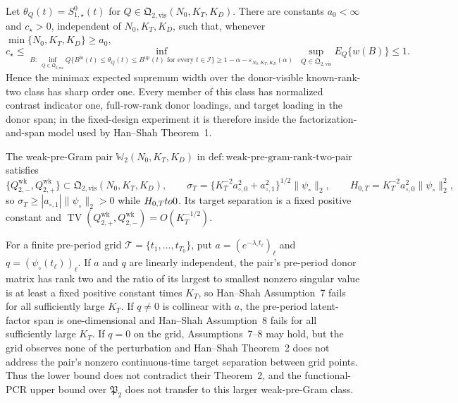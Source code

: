 Let \(\theta_Q(t)=S^0_{1,\star}(t)\) for \(Q\in\mathfrak Q_{2,\mathrm{vis}}(N_0,K_T,K_D)\).  There are constants \(a_0<\infty\) and \(c_\star>0\), independent of \(N_0,K_T,K_D\), such that, whenever \(\min\{N_0,K_T,K_D\}\ge a_0\),
\[
 c_\star\le
 \inf_{B:\ \inf_{Q\in\mathfrak Q_{2,\mathrm{vis}}}
 Q\{B^{\mathrm{lo}}(t)\le\theta_Q(t)\le B^{\mathrm{up}}(t)
 \text{ for every }t\in\mathcal I\}
 \ge1-\alpha-\varepsilon_{N_0,K_T,K_D}(\alpha)}
 \ \sup_{Q\in\mathfrak Q_{2,\mathrm{vis}}}E_Q\{w(B)\}
 \le1.
\]
Hence the minimax expected supremum width over the donor-visible known-rank-two class has sharp order one.  Every member of this class has normalized contrast indicator one, full-row-rank donor loadings, and target loading in the donor span; in the fixed-design experiment it is therefore inside the factorization-and-span model used by Han--Shah Theorem~1.

The weak-pre-Gram pair \(\mathbb W_2(N_0,K_T,K_D)\) in \(\mathrm{def:weak\mbox{-}pre\mbox{-}gram\mbox{-}rank\mbox{-}two\mbox{-}pair}\) satisfies
\[
 \{Q_{2,-}^{\mathrm{wk}},Q_{2,+}^{\mathrm{wk}}\}
 \subset\mathfrak Q_{2,\mathrm{vis}}(N_0,K_T,K_D),
 \qquad
 \sigma_T=\{K_T^{-2}a_{\circ,0}^2+a_{\circ,1}^2\}^{1/2}\|\psi_\circ\|_2,
 \qquad
 H_{0,T}=K_T^{-2}a_{\circ,0}^2\|\psi_\circ\|_2^2,
\]
so \(\sigma_T\ge|a_{\circ,1}|\|\psi_\circ\|_2>0\) while \(H_{0,T}\\to0\).  Its target separation is a fixed positive constant and
\(\operatorname{TV}(Q_{2,+}^{\mathrm{wk}},Q_{2,-}^{\mathrm{wk}})=O(K_T^{-1/2})\).

For a finite pre-period grid \(\mathcal T=\{t_1,\ldots,t_{T_0}\}\), put \(a=(e^{-\lambda_\circ t_\ell})_\ell\) and \(q=(\psi_\circ(t_\ell))_\ell\).  If \(a\) and \(q\) are linearly independent, the pair's pre-period donor matrix has rank two and the ratio of its largest to smallest nonzero singular value is at least a fixed positive constant times \(K_T\), so Han--Shah Assumption~7 fails for all sufficiently large \(K_T\).  If \(q\ne0\) is collinear with \(a\), the pre-period latent-factor span is one-dimensional and Han--Shah Assumption~8 fails for all sufficiently large \(K_T\).  If \(q=0\) on the grid, Assumptions~7--8 may hold, but the grid observes none of the perturbation and Han--Shah Theorem~2 does not address the pair's nonzero continuous-time target separation between grid points.  Thus the lower bound does not contradict their Theorem~2, and the functional-PCR upper bound over \(\mathfrak P_2\) does not transfer to this larger weak-pre-Gram class.